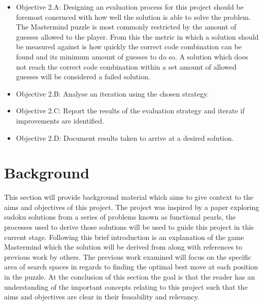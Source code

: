 \documentclass[12pt]{article}  %
\theoremstyle{definition}
\theoremstyle{remark}
\begin{document}
\begin {itemize}
	\begin {itemize}
	\item{Objective 2.A: Designing an evaluation process for this project should be foremost conernced with how well the solution is able to solve the problem. The Mastermind puzzle is most commonly restricted by the amount of guesses allowed to the player. From this the metric in which a solution should be measured against is how quickly the correct code combination can be found and its minimum amount of guesses to do so. A solution which does not reach the correct code combination within a set amount of allowed guesses will be considered a failed solution.}
	\item{Objective 2.B: Analyse an iteration using the chosen strategy.}
	\item{Objective 2.C: Report the results of the evaluation strategy and iterate if improvements are identified.}
	\item{Objective 2.D: Document results taken to arrive at a desired solution.}   
	\end {itemize}
\end {itemize}


%

\newpage                     %
\section{Background}\label{ss:back}

This section will provide background material which aims to give context to the aims and objectives of this project. The project was inspired by a paper exploring sudoku solutions from a series of problems known as functional pearls, the processes used to derive those solutions will be used to guide this project in this current stage. Following this brief introduction is an explanation of the game Mastermind which the solution will be derived from along with references to previous work by others. The previous work examined will focus on the specific area of search spaces in regards to finding the optimal best move at each position in the puzzle. At the conclusion of this section the goal is that the reader has an understanding of the important concepts relating to this project such that the aims and objectives are clear in their feasability and relevancy.
\end{document}
